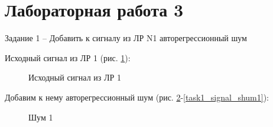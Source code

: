 \documentclass[a4paper,oneside,14pt]{extreport}
\begin{document}


\chapter*{Лабораторная работа 3}

Задание 1 – Добавить к сигналу из ЛР N1 авторегрессионный шум

Исходный сигнал из ЛР 1 (рис. \ref{lr1_signal}):

\begin{figure}[!h]
	\caption{Исходный сигнал из ЛР 1}
	\label{lr1_signal}
\end{figure}

\newpage
Добавим к нему авторегрессионный шум (рис. \ref{task1_shum1}-\ref{task1_signal_shum1}):

\begin{figure}[!h]
	\caption{Шум 1}
	\label{task1_shum1}
\end{figure}
\end{document}
